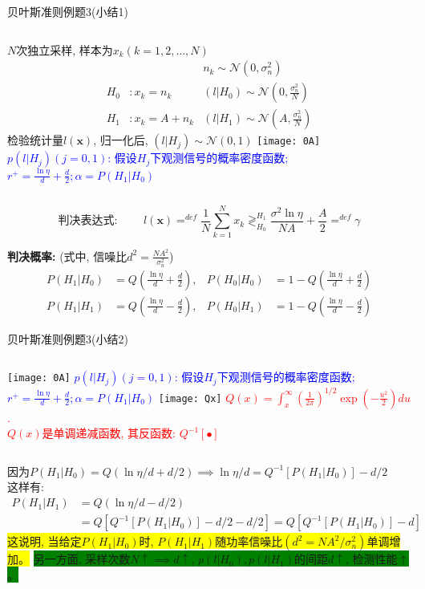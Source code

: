 \begin{frame}[shrink]{贝叶斯准则例题3(小结1)}
\begin{columns}
	$N$次独立采样, 样本为$x_k(k=1,2,\dots,N)$
	\begin{align*}
	&&n_k\sim\mathcal{N}(0,\sigma_n^2)\\ 
	H_0 &:x_k=n_k   &(l|H_0)\sim\mathcal{N}(0,\frac{\sigma_n^2}{N})\\
	H_1 &:x_k=A+n_k &(l|H_1)\sim\mathcal{N}(A,\frac{\sigma_n^2}{N})
	\end{align*}
	检验统计量$l(\bm{x})$, 归一化后, $(l|H_j)\sim\mathcal{N}(0,1)$
	\texttt{[image: 0A]}\\
	\scriptsize
	\textcolor{blue}{$p(l|H_j)(j=0,1)$: 假设$H_j$下观测信号的概率密度函数; $r^+=\frac{\ln\eta}{d}+\frac{d}{2}; \alpha=P(H_1|H_0)$}
\end{columns}
\[
\textbf{判决表达式: }\qquad l(\bm{x})\mathop{=}^{def}\frac{1}{N}\sum\limits_{k=1}^Nx_k\mathop{\gtrless}_{H_0}^{H_1}\frac{\sigma^2\ln\eta}{NA}+\frac{A}{2}\mathop{=}^{def}\gamma
\]

\textbf{判决概率:} (式中, 信噪比$d^2=\frac{NA^2}{\sigma_n^2}$)
\begin{align*}
P(H_1|H_0)&=Q\left(\frac{\ln\eta}{d}+\frac{d}{2}\right), &P(H_0|H_0)&=1-Q\left(\frac{\ln\eta}{d}+\frac{d}{2}\right)\\
P(H_1|H_1)&=Q\left(\frac{\ln\eta}{d}-\frac{d}{2}\right),
&P(H_0|H_1)&=1-Q\left(\frac{\ln\eta}{d}-\frac{d}{2}\right)
\end{align*}
\end{frame}

\begin{frame}{贝叶斯准则例题3(小结2)}
\begin{columns}
	\texttt{[image: 0A]}
	\scriptsize
	\textcolor{blue}{$p(l|H_j)(j=0,1)$: 假设$H_j$下观测信号的概率密度函数; $r^+=\frac{\ln\eta}{d}+\frac{d}{2}; \alpha=P(H_1|H_0)$}
	\texttt{[image: Qx]}
	\scriptsize
	\textcolor{red}{$Q(x)=\int_{x}^{\infty}\left(\frac{1}{2\pi}\right)^{1/2}\exp\left(-\frac{u^2}{2}\right)du$.}\\
	\textcolor{red}{$Q(x)$是单调递减函数, 其反函数: $Q^{-1}[\bullet]$}
\end{columns}

\bigskip

因为$P(H_1|H_0)=Q(\ln\eta/d+d/2) \implies \ln\eta/d=Q^{-1}[P(H_1|H_0)]-d/2$\\
这样有:
\begin{align*}
P(H_1|H_1)&=Q\left(\ln\eta/d-d/2\right)\\
&=Q[Q^{-1}[P(H_1|H_0)]-d/2-d/2]=Q[Q^{-1}[P(H_1|H_0)]-d]
\end{align*}
\colorbox{yellow}{这说明, 当给定$P(H_1|H_0)$时, $P(H_1|H_1)$随功率信噪比$(d^2=NA^2/\sigma_n^2)$单调增加。} 
\colorbox{green}{另一方面, 采样次数$N\uparrow\implies d\uparrow$, $p(l|H_0),p(l|H_1)$的间距$d\uparrow$,  检测性能$\uparrow$。} 
\end{frame}


